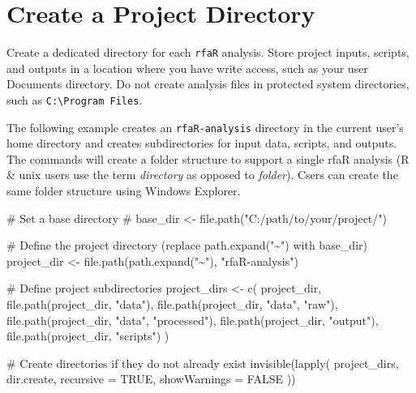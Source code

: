 \documentclass[
  letterpaper,
  DIV=11,
  numbers=noendperiod]{scrreprt}
\newenvironment{Shaded}{\begin{snugshade}}{\end{snugshade}}
\newcommand{\AttributeTok}[1]{\textcolor[rgb]{0.40,0.45,0.13}{#1}}
\newcommand{\CommentTok}[1]{\textcolor[rgb]{0.37,0.37,0.37}{#1}}
\newcommand{\ConstantTok}[1]{\textcolor[rgb]{0.56,0.35,0.01}{#1}}
\newcommand{\FunctionTok}[1]{\textcolor[rgb]{0.28,0.35,0.67}{#1}}
\newcommand{\NormalTok}[1]{\textcolor[rgb]{0.00,0.23,0.31}{#1}}
\newcommand{\OtherTok}[1]{\textcolor[rgb]{0.00,0.23,0.31}{#1}}
\newcommand{\StringTok}[1]{\textcolor[rgb]{0.13,0.47,0.30}{#1}}
\begin{document}
\section{Create a Project Directory}\label{create-a-project-directory}

Create a dedicated directory for each \texttt{rfaR} analysis. Store
project inputs, scripts, and outputs in a location where you have write
access, such as your user Documents directory. Do not create analysis
files in protected system directories, such as
\texttt{C:\textbackslash{}Program\ Files}.

The following example creates an \texttt{rfaR-analysis} directory in the
current user's home directory and creates subdirectories for input data,
scripts, and outputs. The commands will create a folder structure to
support a single rfaR analysis (R \& unix users use the term
\emph{directory} as opposed to \emph{folder}). Csers can create the same
folder structure using Windows Explorer.

\begin{Shaded}
\begin{Highlighting}[]
\CommentTok{\# Set a base directory}
\CommentTok{\# base\_dir \textless{}{-} file.path("C:/path/to/your/project/")}

\CommentTok{\# Define the project directory (replace path.expand("\textasciitilde{}") with base\_dir)}
\NormalTok{project\_dir }\OtherTok{\textless{}{-}} \FunctionTok{file.path}\NormalTok{(}\FunctionTok{path.expand}\NormalTok{(}\StringTok{"\textasciitilde{}"}\NormalTok{), }\StringTok{"rfaR{-}analysis"}\NormalTok{)}

\CommentTok{\# Define project subdirectories}
\NormalTok{project\_dirs }\OtherTok{\textless{}{-}} \FunctionTok{c}\NormalTok{(}
\NormalTok{  project\_dir,}
  \FunctionTok{file.path}\NormalTok{(project\_dir, }\StringTok{"data"}\NormalTok{),}
  \FunctionTok{file.path}\NormalTok{(project\_dir, }\StringTok{"data"}\NormalTok{, }\StringTok{"raw"}\NormalTok{),}
  \FunctionTok{file.path}\NormalTok{(project\_dir, }\StringTok{"data"}\NormalTok{, }\StringTok{"processed"}\NormalTok{),}
  \FunctionTok{file.path}\NormalTok{(project\_dir, }\StringTok{"output"}\NormalTok{),}
  \FunctionTok{file.path}\NormalTok{(project\_dir, }\StringTok{"scripts"}\NormalTok{)}
\NormalTok{)}

\CommentTok{\# Create directories if they do not already exist}
\FunctionTok{invisible}\NormalTok{(}\FunctionTok{lapply}\NormalTok{(}
\NormalTok{  project\_dirs,}
\NormalTok{  dir.create,}
  \AttributeTok{recursive =} \ConstantTok{TRUE}\NormalTok{,}
  \AttributeTok{showWarnings =} \ConstantTok{FALSE}
\NormalTok{))}
\end{Highlighting}
\end{Shaded}
\end{document}
